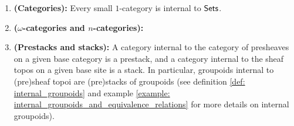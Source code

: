                     \begin{example} \label{example: internal_categories}
                        \noindent
                        \begin{enumerate}
                            \item \textbf{(Categories):} Every small $1$-category is internal to $\mathsf{Sets}$.
                            \item \textbf{($\omega$-categories and $n$-categories):} 
                            \item \textbf{(Prestacks and stacks):} A category internal to the category of presheaves on a given base category is a prestack, and a category internal to the sheaf topos on a given base site is a stack. In particular, groupoids internal to (pre)sheaf topoi are (pre)stacks of groupoids (see definition \ref{def: internal_groupoids} and example \ref{example: internal_groupoids_and_equivalence_relations} for more details on internal groupoids).  
                        \end{enumerate}
                    \end{example}
                    
